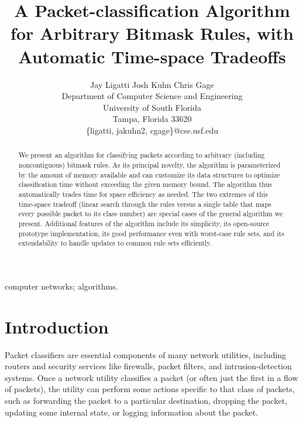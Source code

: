 \documentclass[10pt, conference, compsocconf]{IEEEtran}
\begin{document}
\title{A Packet-classification Algorithm for Arbitrary Bitmask Rules, with Automatic Time-space Tradeoffs}
\author{Jay Ligatti \qquad Josh Kuhn \qquad Chris Gage\\
Department of Computer Science and Engineering\\
University of South Florida\\
Tampa, Florida 33620\\
\{ligatti, jakuhn2, cgage\}@cse.usf.edu
}

\maketitle

\begin{abstract}
  We present an algorithm for classifying packets according to arbitrary
  (including noncontiguous) bitmask rules.  As its principal novelty, the
  algorithm is parameterized by the amount of memory available and can customize
  its data structures to optimize classification time without exceeding the
  given memory bound.  The algorithm thus automatically trades time for space
  efficiency as needed.  The two extremes of this time-space tradeoff (linear
  search through the rules versus a single table that maps every possible packet
  to its class number) are special cases of the general algorithm we present.
  Additional features of the algorithm include its simplicity, its open-source
  prototype implementation, its good performance even with worst-case rule sets,
  and its extendability to handle updates to common rule sets efficiently.
\end{abstract}

\begin{IEEEkeywords}
computer networks; algorithms.
\end{IEEEkeywords}
%

\section{Introduction}
Packet classifiers are essential components of many network utilities, including
routers and security services like firewalls, packet filters, and
intrusion-detection systems. Once a network utility classifies a packet (or
often just the first in a flow of packets), the utility can perform some actions
specific to that class of packets, such as forwarding the packet to a particular
destination, dropping the packet, updating some internal state, or logging
information about the packet.
\end{document}
